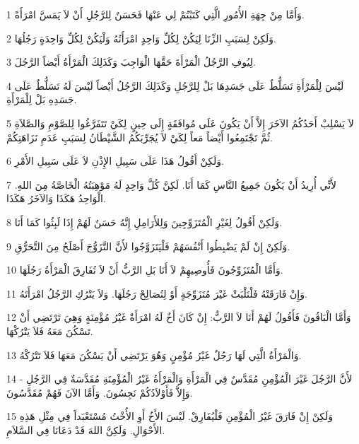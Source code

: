 \par 1 وَأَمَّا مِنْ جِهَةِ الأُمُورِ الَّتِي كَتَبْتُمْ لِي عَنْهَا فَحَسَنٌ لِلرَّجُلِ أَنْ لاَ يَمَسَّ امْرَأَةً.
\par 2 وَلَكِنْ لِسَبَبِ الزِّنَا لِيَكُنْ لِكُلِّ وَاحِدٍ امْرَأَتُهُ وَلْيَكُنْ لِكُلِّ وَاحِدَةٍ رَجُلُهَا.
\par 3 لِيُوفِ الرَّجُلُ الْمَرْأَةَ حَقَّهَا الْوَاجِبَ وَكَذَلِكَ الْمَرْأَةُ أَيْضاً الرَّجُلَ.
\par 4 لَيْسَ لِلْمَرْأَةِ تَسَلُّطٌ عَلَى جَسَدِهَا بَلْ لِلرَّجُلِ وَكَذَلِكَ الرَّجُلُ أَيْضاً لَيْسَ لَهُ تَسَلُّطٌ عَلَى جَسَدِهِ بَلْ لِلْمَرْأَةِ.
\par 5 لاَ يَسْلِبْ أَحَدُكُمُ الآخَرَ إِلاَّ أَنْ يَكُونَ عَلَى مُوافَقَةٍ إِلَى حِينٍ لِكَيْ تَتَفَرَّغُوا لِلصَّوْمِ وَالصَّلاَةِ ثُمَّ تَجْتَمِعُوا أَيْضاً مَعاً لِكَيْ لاَ يُجَرِّبَكُمُ الشَّيْطَانُ لِسَبَبِ عَدَمِ نَزَاهَتِكُمْ.
\par 6 وَلَكِنْ أَقُولُ هَذَا عَلَى سَبِيلِ الإِذْنِ لاَ عَلَى سَبِيلِ الأَمْرِ.
\par 7 لأَنِّي أُرِيدُ أَنْ يَكُونَ جَمِيعُ النَّاسِ كَمَا أَنَا. لَكِنَّ كُلَّ وَاحِدٍ لَهُ مَوْهِبَتُهُ الْخَاصَّةُ مِنَ اللهِ. الْوَاحِدُ هَكَذَا وَالآخَرُ هَكَذَا.
\par 8 وَلَكِنْ أَقُولُ لِغَيْرِ الْمُتَزَوِّجِينَ وَلِلأَرَامِلِ إِنَّهُ حَسَنٌ لَهُمْ إِذَا لَبِثُوا كَمَا أَنَا.
\par 9 وَلَكِنْ إِنْ لَمْ يَضْبِطُوا أَنْفُسَهُمْ فَلْيَتَزَوَّجُوا لأَنَّ التَّزَوُّجَ أَصْلَحُ مِنَ التَّحَرُّقِ.
\par 10 وَأَمَّا الْمُتَزَوِّجُونَ فَأُوصِيهِمْ لاَ أَنَا بَلِ الرَّبُّ أَنْ لاَ تُفَارِقَ الْمَرْأَةُ رَجُلَهَا.
\par 11 وَإِنْ فَارَقَتْهُ فَلْتَلْبَثْ غَيْرَ مُتَزَوِّجَةٍ أَوْ لِتُصَالِحْ رَجُلَهَا. وَلاَ يَتْرُكِ الرَّجُلُ امْرَأَتَهُ.
\par 12 وَأَمَّا الْبَاقُونَ فَأَقُولُ لَهُمْ أَنَا لاَ الرَّبُّ: إِنْ كَانَ أَخٌ لَهُ امْرَأَةٌ غَيْرُ مُؤْمِنَةٍ وَهِيَ تَرْتَضِي أَنْ تَسْكُنَ مَعَهُ فَلاَ يَتْرُكْهَا.
\par 13 وَالْمَرْأَةُ الَّتِي لَهَا رَجُلٌ غَيْرُ مُؤْمِنٍ وَهُوَ يَرْتَضِي أَنْ يَسْكُنَ مَعَهَا فَلاَ تَتْرُكْهُ.
\par 14 لأَنَّ الرَّجُلَ غَيْرَ الْمُؤْمِنِ مُقَدَّسٌ فِي الْمَرْأَةِ وَالْمَرْأَةُ غَيْرُ الْمُؤْمِنَةِ مُقَدَّسَةٌ فِي الرَّجُلِ - وَإِلاَّ فَأَوْلاَدُكُمْ نَجِسُونَ. وَأَمَّا الآنَ فَهُمْ مُقَدَّسُونَ.
\par 15 وَلَكِنْ إِنْ فَارَقَ غَيْرُ الْمُؤْمِنِ فَلْيُفَارِقْ. لَيْسَ الأَخُ أَوِ الأُخْتُ مُسْتَعْبَداً فِي مِثْلِ هَذِهِ الأَحْوَالِ. وَلَكِنَّ اللهَ قَدْ دَعَانَا فِي السَّلاَمِ.
